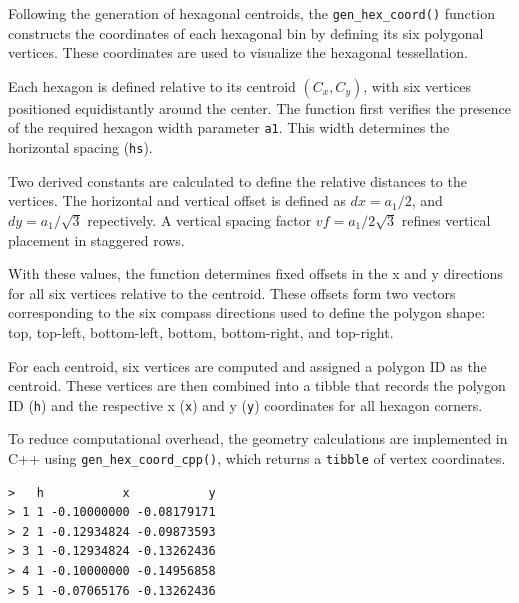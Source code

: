 \documentclass[
  11pt,
  a4paper,
]{report}
\newenvironment{Shaded}{\begin{snugshade}}{\end{snugshade}}
\newcommand{\AttributeTok}[1]{\textcolor[rgb]{0.40,0.45,0.13}{#1}}
\newcommand{\DecValTok}[1]{\textcolor[rgb]{0.68,0.00,0.00}{#1}}
\newcommand{\FunctionTok}[1]{\textcolor[rgb]{0.28,0.35,0.67}{#1}}
\newcommand{\NormalTok}[1]{\textcolor[rgb]{0.00,0.23,0.31}{#1}}
\newcommand{\OtherTok}[1]{\textcolor[rgb]{0.00,0.23,0.31}{#1}}
\newcommand{\SpecialCharTok}[1]{\textcolor[rgb]{0.37,0.37,0.37}{#1}}
\begin{document}
Following the generation of hexagonal centroids, the
\texttt{gen\_hex\_coord()} function constructs the coordinates of each
hexagonal bin by defining its six polygonal vertices. These coordinates
are used to visualize the hexagonal tessellation.

Each hexagon is defined relative to its centroid \((C_x, C_y)\), with
six vertices positioned equidistantly around the center. The function
first verifies the presence of the required hexagon width parameter
\texttt{a1}. This width determines the horizontal spacing (\texttt{hs}).

Two derived constants are calculated to define the relative distances to
the vertices. The horizontal and vertical offset is defined as
\(dx = a_1/2\), and \(dy = a_1/\sqrt{3}\) repectively. A vertical
spacing factor \(vf = a_1/2\sqrt{3}\) refines vertical placement in
staggered rows.

With these values, the function determines fixed offsets in the x and y
directions for all six vertices relative to the centroid. These offsets
form two vectors corresponding to the six compass directions used to
define the polygon shape: top, top-left, bottom-left, bottom,
bottom-right, and top-right.

For each centroid, six vertices are computed and assigned a polygon ID
as the centroid. These vertices are then combined into a tibble that
records the polygon ID (\texttt{h}) and the respective x (\texttt{x})
and y (\texttt{y}) coordinates for all hexagon corners.

To reduce computational overhead, the geometry calculations are
implemented in C++ using \texttt{gen\_hex\_coord\_cpp()}, which returns
a \texttt{tibble} of vertex coordinates.

\begin{Shaded}
\end{Shaded}

\begin{verbatim}
>   h           x           y
> 1 1 -0.10000000 -0.08179171
> 2 1 -0.12934824 -0.09873593
> 3 1 -0.12934824 -0.13262436
> 4 1 -0.10000000 -0.14956858
> 5 1 -0.07065176 -0.13262436
\end{verbatim}
\end{document}
